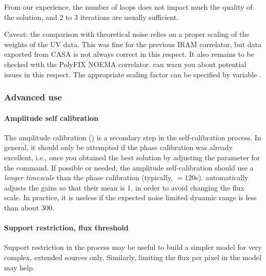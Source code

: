 From our experience, the number of loops  does not impact 
much the quality of the solution, and 2 to 3 iterations are usually 
sufficient.


Caveat: the comparison with theoretical noise relies on a proper 
scaling of the weights of the UV data. This was fine for the previous
IRAM correlator, but data exported from CASA is not always correct in this respect.
It also remains to be checked with the PolyFIX NOEMA correlator. 
 can warn you about potential issues in this respect. 
The appropriate scaling factor can be specified by variable .

\subsubsection{Advanced use}

\paragraph{Amplitude self calibration}
The amplitude calibration () is a secondary step in the self-calibration process.
In general, it should only be attempted if the phase calibration was 
already excellent, i.e., once you obtained the best solution by 
adjusting the  parameter for the 
 command. If possible or needed, the amplitude 
self-calibration should use a \textit{longer timescale} than the phase 
calibration (typically, $=120$s).  
automatically adjusts the gains so that their mean is 1, in order to 
avoid changing the flux scale. In practice, it is useless if the expected noise
limited dynamic range is less than about 300.

\paragraph{Support restriction, flux threshold}
Support restriction in the  process may be useful to build a 
simpler model for very complex, extended sources only.  Similarly, limiting
the flux per pixel in the model may help.

